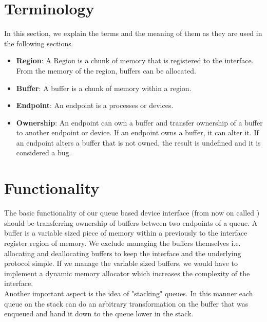 \documentclass[a4paper,11pt,twoside]{report}
\begin{document}
	\section{Terminology}
	In this section, we explain the terms and the meaning of them as they are used in the following sections.
	\begin{itemize}
		
		\item \textbf{Region}: A Region is a chunk of memory that is registered to the \devif interface. From the memory of the region, buffers can be allocated.
		\item \textbf{Buffer}: A buffer is a chunk of memory within a region.
		\item \textbf{Endpoint}: An endpoint is a processes or devices. 
		\item \textbf{Ownership}: An endpoint can own a buffer and transfer ownership of a buffer to another endpoint or device. 
		If an endpoint owns a buffer, it can alter it. If an endpoint alters a buffer that is not owned, 
		the result is undefined and it is considered a bug. 
	\end{itemize}
	
	\section{Functionality}
	The basic functionality of our queue based device interface (from now on called \devif) 
	should be transferring ownership of buffers between two endpoints of a queue.  
	A buffer is a variable sized piece of memory within a previously to the \devif interface 
	register region of memory. We exclude managing the buffers themselves i.e. allocating 
	and deallocating buffers to keep the interface and the underlying protocol simple. 
	If we manage the variable sized buffers, we would have to implement a dynamic memory 
	allocator which increases the complexity of the \devif interface. 
	\\
	Another important aspect is the idea of "stacking" queues. In this manner each 
	queue on the stack can do an arbitrary transformation on the buffer that was enqueued 
	and hand it down to the queue lower in the stack. 
	
\end{document}
